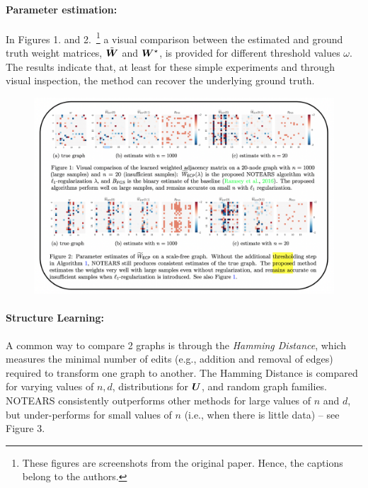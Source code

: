 \documentclass[11pt,a4paper]{article}
\begin{document}
\paragraph{Parameter estimation:} In Figures 1. and 2.~\footnote{These figures are screenshots from the original paper. Hence, the captions belong to the authors. } a visual comparison between the estimated and ground truth weight matrices, $\tilde{{\bm{W}}}$ and ${\bm{W}}^\star$, is provided for different threshold values $\omega$.
The results indicate that, at least for these simple experiments and through visual inspection, the method can recover the underlying ground truth.


\begin{figure}[h]
\center
\includegraphics[width=16cm]{figures/fig1_and_2.png}
\label{fig:figs_1_2}
\end{figure}

\paragraph{Structure Learning:} A common way to compare 2 graphs is through the \emph{Hamming Distance}, which measures the minimal number of edits (e.g., addition and removal of edges)  required to transform one graph to another. The Hamming Distance is compared for varying values of $n, d$, distributions for ${\bm{U}}$, and random graph families. NOTEARS consistently outperforms other methods for large values of $n$ and $d$, but under-performs for small values of $n$ (i.e., when there is little data) -- see Figure 3. 
\end{document}
